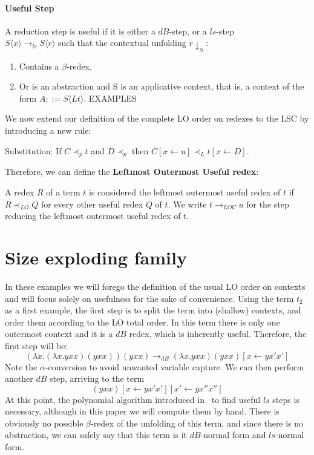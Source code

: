 \documentclass[11pt]{article}
\begin{document}
\paragraph{Useful Step} A reduction step is useful if it is either a $dB$-step, or a $ls$-step \\ $S\langle x \rangle \rightarrow_{ls} S\langle r \rangle$ such that the contextual unfolding $r \downarrow_S$:
\begin{enumerate}
  \item Contains a $\beta$-redex,
  \item Or is an abstraction and S is an applicative context, that is, a context of the form $A ::= S\langle Lt \rangle$.
        EXAMPLES
\end{enumerate}
We now extend our definition of the complete LO order on redexes to the LSC by introducing a new rule:
\begin{center}
  Substitution: If $C \prec_p t$ and $D \prec_p$ then $C[x \leftarrow u] \prec_L t[x \leftarrow D]$.
\end{center}
Therefore, we can define the \textbf{Leftmost Outermost Useful redex}:
\begin{center}
  A redex $R$ of a term $t$ is considered the leftmost outermost useful redex of $t$ if $R \prec_{LO} Q$ for every other useful redex $Q$ of $t$. We write $t \rightarrow_{LOU} u$ for the step reducing the leftmost outermost useful redex of t.
\end{center}
\section{Size exploding family}
In these examples we will forego the definition of the usual LO order on contexts and will focus solely on usefulness for the sake of convenience.
Using the term $t_2$ as a first example, the first step is to split the term into (shallow) contexts, and order them according to the LO total order. In this term there is only one outermost context and it is a $dB$ redex, which is inherently useful. Therefore, the first step will be:
\begin{equation*}
  (\lambda x . (\lambda x . yxx) (yxx))(yxx) \rightarrow_{dB} (\lambda x . yxx)(yxx)[x \leftarrow yx'x']
\end{equation*}
Note the $\alpha$-conversion to avoid unwanted variable capture.
We can then perform another $dB$ step, arriving to the term
\begin{equation*}
  (yxx)[x \leftarrow yx'x'][x' \leftarrow yx''x'']
\end{equation*}
At this point, the polynomial algorithm introduced in~\cite{beta-invariance} to find useful $ls$ steps is necessary, although in this paper we will compute them by hand. There is obviously no possible $\beta$-redex of the unfolding of this term, and since there is no abstraction, we can safely say that this term is it $dB$-normal form and $ls$-normal form.
\end{document}
